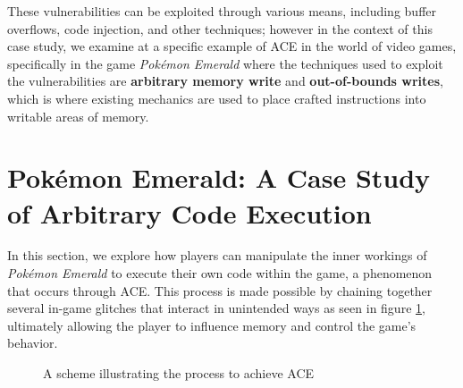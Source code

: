 \documentclass[a4paper]{usiinfbachelorproject}
\begin{document}
These vulnerabilities can be exploited through various means, including buffer overflows, code injection, and other techniques; however in the context of this case study, we examine at a specific example of ACE in the world of video games, specifically in the game \textit{Pokémon Emerald} where the techniques used to exploit the vulnerabilities are \textbf{arbitrary memory write} and \textbf{out-of-bounds writes}, which is where existing mechanics are used to place crafted instructions into writable areas of memory.




\section{Pokémon Emerald: A Case Study of Arbitrary Code Execution}
\label{sec:case_study}
In this section, we explore how players can manipulate the inner workings of \textit{Pokémon Emerald} to execute their own code within the game, a phenomenon that occurs through ACE. This process is made possible by chaining together several in-game glitches that interact in unintended ways as seen in figure \ref{fig:ace_scheme}, ultimately allowing the player to influence memory and control the game’s behavior.

\begin{figure}[h!]
	\caption{A scheme illustrating the process to achieve ACE}\label{fig:ace_scheme}
\end{figure}
\end{document}

